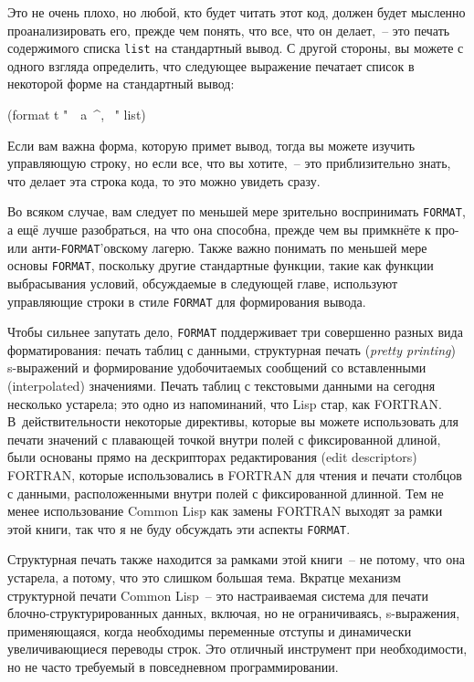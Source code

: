 Это не очень плохо, но любой, кто будет читать этот код, должен будет мысленно
проанализировать его, прежде чем понять, что все, что он делает,~-- это печать содержимого
списка \lstinline{list} на стандартный вывод. С другой стороны, вы можете с одного взгляда
определить, что следующее выражение печатает список в некоторой форме на стандартный
вывод:

\begin{myverb}
(format t "~{~a~^, ~}" list)
\end{myverb}

Если вам важна форма, которую примет вывод, тогда вы можете изучить управ\-ляю\-щую строку, но
если все, что вы хотите,~-- это приблизительно знать, что делает эта строка кода, то это
можно увидеть сразу.

Во всяком случае, вам следует по меньшей мере зрительно воспринимать \lstinline{FORMAT}, а ещё
лучше разобраться, на что она способна, прежде чем вы примкнёте к про- или
анти-\lstinline{FORMAT}'овскому лагерю. Также важно понимать по меньшей мере основы
\lstinline{FORMAT}, поскольку другие стандартные функции, такие как функции выбрасывания
условий, обсуждаемые в следующей главе, используют управляющие строки в стиле
\lstinline{FORMAT} для формирования вывода.

Чтобы сильнее запутать дело, \lstinline{FORMAT} поддерживает три совершенно разных вида
форматирования: печать таблиц с данными, структурная печать (\textit{pretty printing})
s-выражений и формирование удобочитаемых сообщений со вставленными (interpolated)
значениями. Печать таблиц с текстовыми данными на сегодня несколько устарела; это одно из
напоминаний, что Lisp стар, как FORTRAN. В~действительности некоторые директивы, которые
вы можете использовать для печати значений с плавающей точкой внутри полей с фиксированной
длиной, были основаны прямо на дескрипторах редактирования (edit descriptors) FORTRAN,
которые использовались в FORTRAN для чтения и печати столбцов с данными, расположенными
внутри полей с фиксированной длинной. Тем не менее использование Common Lisp как замены
FORTRAN выходят за рамки этой книги, так что я не буду обсуждать эти аспекты
\lstinline{FORMAT}.

Структурная печать также находится за рамками этой книги~-- не потому, что она устарела, а
потому, что это слишком большая тема. Вкратце механизм структурной печати Common Lisp~--
это настраиваемая система для печати блочно-структурированных данных, включая, но не
ограничиваясь, s-выражения, применяющаяся, когда необходимы переменные отступы и
динамически увеличивающиеся переводы строк. Это отличный инструмент при необходимости, но
не часто требуемый в повседневном программировании.

